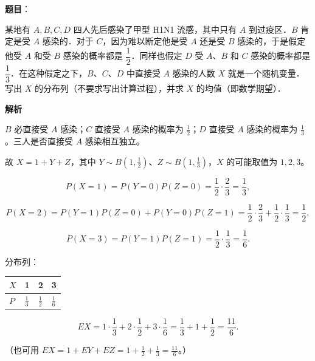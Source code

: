 \begin{answer}

\textbf{题目}：

某地有 $A,B,C,D$ 四人先后感染了甲型 H1N1 流感，其中只有 $A$ 到过疫区．$B$ 肯定是受 $A$ 感染的．对于 $C$，因为难以断定他是受 $A$ 还是受 $B$ 感染的，于是假定他受 $A$ 和受 $B$ 感染的概率都是 $\dfrac12$．同样也假定 $D$ 受 $A$、$B$ 和 $C$ 感染的概率都是 $\dfrac13$．在这种假定之下，$B$、$C$、$D$ 中直接受 $A$ 感染的人数 $X$ 就是一个随机变量．写出 $X$ 的分布列（不要求写出计算过程），并求 $X$ 的均值（即数学期望）．

\textbf{解析}

$B$ 必直接受 $A$ 感染；$C$ 直接受 $A$ 感染的概率为 $\frac12$；$D$ 直接受 $A$ 感染的概率为 $\frac13$。三人是否直接受 $A$ 感染相互独立。

故 $X=1+Y+Z$，其中 $Y\sim B\left(1,\frac12\right)$、$Z\sim B\left(1,\frac13\right)$，$X$ 的可能取值为 $1,2,3$。

\nopagebreak[4]
\[P(X=1)=P(Y=0)P(Z=0)=\frac12\cdot\frac23=\frac13,\]

\nopagebreak[4]
\[P(X=2)=P(Y=1)P(Z=0)+P(Y=0)P(Z=1)
=\frac12\cdot\frac23+\frac12\cdot\frac13=\frac12,\]

\nopagebreak[4]
\[P(X=3)=P(Y=1)P(Z=1)=\frac12\cdot\frac13=\frac16 .\]

分布列：

\begin{center}
\begin{tabular}{llll}
\toprule
$X$ & 1 & 2 & 3 \\
\midrule
$P$ & $\frac13$ & $\frac12$ & $\frac16$ \\
\bottomrule
\end{tabular}
\end{center}

\nopagebreak[4]
\[EX=1\cdot\frac13+2\cdot\frac12+3\cdot\frac16
=\frac13+1+\frac12=\frac{11}{6}.\]

（也可用 $EX=1+EY+EZ=1+\frac12+\frac13=\frac{11}{6}$。）


\end{answer}
